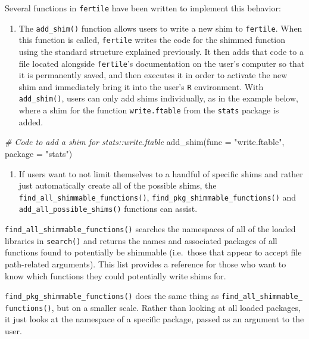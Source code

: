 \documentclass[12pt,twoside]{reedthesis}
\newenvironment{Shaded}{\begin{snugshade}}{\end{snugshade}}
\newcommand{\AttributeTok}[1]{\textcolor[rgb]{0.77,0.63,0.00}{#1}}
\newcommand{\CommentTok}[1]{\textcolor[rgb]{0.56,0.35,0.01}{\textit{#1}}}
\newcommand{\FunctionTok}[1]{\textcolor[rgb]{0.00,0.00,0.00}{#1}}
\newcommand{\NormalTok}[1]{#1}
\newcommand{\StringTok}[1]{\textcolor[rgb]{0.31,0.60,0.02}{#1}}
\providecommand{\tightlist}{%
  \setlength{\itemsep}{0pt}\setlength{\parskip}{0pt}}
\begin{document}
Several functions in \texttt{fertile} have been written to implement this behavior:
\begin{enumerate}
\def\labelenumi{\arabic{enumi}.}
\tightlist
\item
  The \texttt{add\_shim()} function allows users to write a new shim to \texttt{fertile}. When this function is called, \texttt{fertile} writes the code for the shimmed function using the standard structure explained previously. It then adds that code to a file located alongside \texttt{fertile}'s documentation on the user's computer so that it is permanently saved, and then executes it in order to activate the new shim and immediately bring it into the user's \texttt{R} environment. With \texttt{add\_shim()}, users can only add shims individually, as in the example below, where a shim for the function \texttt{write.ftable} from the \texttt{stats} package is added.
\end{enumerate}
\begin{Shaded}
\begin{Highlighting}[]
\CommentTok{\# Code to add a shim for stats::write.ftable }
\FunctionTok{add\_shim}\NormalTok{(}\AttributeTok{func =} \StringTok{"write.ftable"}\NormalTok{, }\AttributeTok{package =} \StringTok{"stats"}\NormalTok{)}
\end{Highlighting}
\end{Shaded}
\begin{enumerate}
\def\labelenumi{\arabic{enumi}.}
\setcounter{enumi}{1}
\tightlist
\item
  If users want to not limit themselves to a handful of specific shims and rather just automatically create all of the possible shims, the \texttt{find\_all\_shimmable\_functions()}, \texttt{find\_pkg\_shimmable\_functions()} and \texttt{add\_all\_possible\_shims()} functions can assist.
\end{enumerate}
\texttt{find\_all\_shimmable\_functions()} searches the namespaces of all of the loaded libraries in \texttt{search()} and returns the names and associated packages of all functions found to potentially be shimmable (i.e.~those that appear to accept file path-related arguments). This list provides a reference for those who want to know which functions they could potentially write shims for.

\texttt{find\_pkg\_shimmable\_functions()} does the same thing as \texttt{find\_all\_shimmable\_}
\texttt{functions()}, but on a smaller scale. Rather than looking at all loaded packages, it just looks at the namespace of a specific package, passed as an argument to the user.
\end{document}
